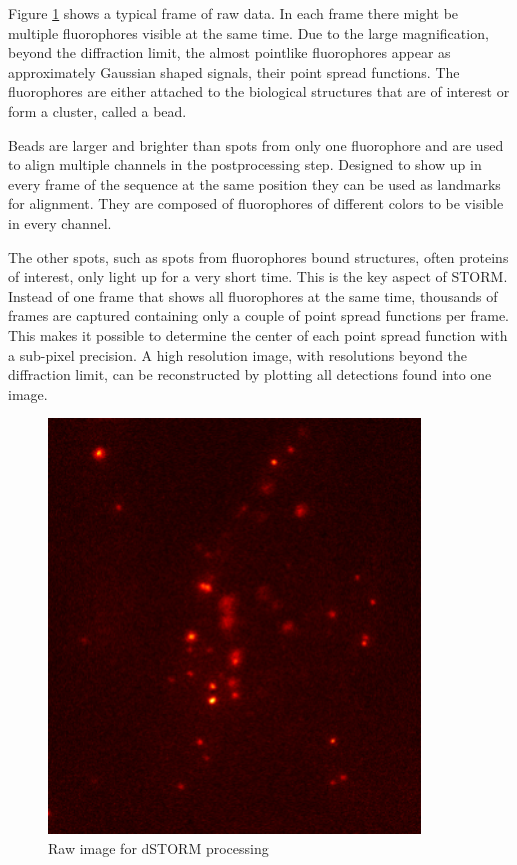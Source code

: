 Figure \ref{rawStorm} shows a typical frame of raw data. In each frame there might be multiple fluorophores visible at the same time. Due to the large magnification, beyond the diffraction limit, the almost pointlike fluorophores appear as approximately Gaussian shaped signals, their point spread functions. The fluorophores are either attached to the biological structures that are of interest or form a cluster, called a bead.\newline

Beads are larger and brighter than spots from only one fluorophore and are used to align multiple channels in the postprocessing step. Designed to show up in every frame of the sequence at the same position they can be used as landmarks for alignment. They are composed of fluorophores of different colors to be visible in every channel.\newline

The other spots, such as spots from fluorophores bound structures, often proteins of interest, only light up for a very short time. This is the key aspect of STORM. Instead of one frame that shows all fluorophores at the same time, thousands of frames are captured containing only a couple of point spread functions per frame. This makes it possible to determine the center of each point spread function with a sub-pixel precision. A high resolution image, with resolutions beyond the diffraction limit, can be reconstructed by plotting all detections found into one image.

\begin{figure}
\centering
\includegraphics[width = 0.88\textwidth]{pictures/Pos2_2_red2-2frame2475Color.png}
	\caption{Raw image for dSTORM processing}
	\label{rawStorm}
\end{figure}


